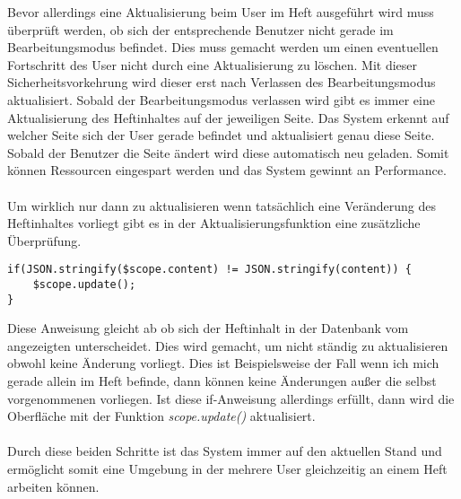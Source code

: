 Bevor allerdings eine Aktualisierung beim User im Heft ausgeführt wird muss überprüft werden, ob sich der entsprechende Benutzer nicht gerade im Bearbeitungsmodus befindet. Dies muss gemacht werden um einen eventuellen Fortschritt des User nicht durch eine Aktualisierung zu löschen. Mit dieser Sicherheitsvorkehrung wird dieser erst nach Verlassen des Bearbeitungsmodus aktualisiert. Sobald der Bearbeitungsmodus verlassen wird gibt es immer eine Aktualisierung des Heftinhaltes auf der jeweiligen Seite. Das System erkennt auf welcher Seite sich der User gerade befindet und aktualisiert genau diese Seite. Sobald der Benutzer die Seite ändert wird diese automatisch neu geladen. Somit können Ressourcen eingespart werden und das System gewinnt an Performance.\\
\\
Um wirklich nur dann zu aktualisieren wenn tatsächlich eine Veränderung des Heftinhaltes vorliegt gibt es in der Aktualisierungsfunktion eine zusätzliche Überprüfung. 
\begin{lstlisting}[caption={Synchronisation - PWS}]
if(JSON.stringify($scope.content) != JSON.stringify(content)) {
	$scope.update();
}
\end{lstlisting}
Diese Anweisung gleicht ab ob sich der Heftinhalt in der Datenbank vom angezeigten unterscheidet. Dies wird gemacht, um nicht ständig zu aktualisieren obwohl keine Änderung vorliegt. Dies ist Beispielsweise der Fall wenn ich mich gerade allein im Heft befinde, dann können keine Änderungen außer die selbst vorgenommenen vorliegen. Ist diese if-Anweisung allerdings erfüllt, dann wird die Oberfläche mit der Funktion \textit{scope.update()} aktualisiert.\\ 
\\
Durch diese beiden Schritte ist das System immer auf den aktuellen Stand und ermöglicht somit eine Umgebung in der mehrere User gleichzeitig an einem Heft arbeiten können. 
 

